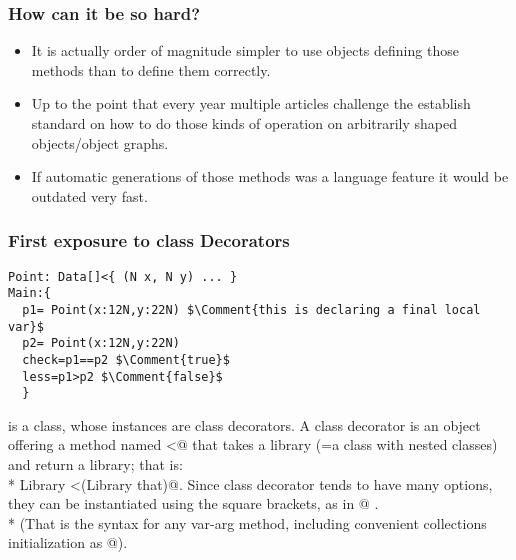 \begin{frame}[fragile]
\frametitle{How can it be so hard?}
\begin{itemize}
\item It is actually order of magnitude  simpler to use objects defining those methods than to define them correctly.
\pause\item Up to the point that every year multiple articles challenge  the establish standard on how to
do those kinds of operation on arbitrarily shaped objects/object graphs.
\pause\item If automatic generations of those methods was a language feature
it would be outdated very fast.
\end{itemize}
\end{frame}


\begin{frame}[fragile]
\frametitle{First exposure to class Decorators}
\begin{NiceCode}{59ex}{0.8}
\begin{lstlisting}
Point: Data[]<{ (N x, N y) ... }
Main:{
  p1= Point(x:12N,y:22N) $\Comment{this is declaring a final local var}$
  p2= Point(x:12N,y:22N)
  check=p1==p2 $\Comment{true}$
  less=p1>p2 $\Comment{false}$
  }
\end{lstlisting}
\end{NiceCode}
\Q@Data@  is a class, whose instances are class decorators.
A class decorator is an object offering  a method named \Q@<@ that takes a library (=a class with nested classes) and return a library; that is:\\*
\Q@method Library <(Library that)@.
Since class decorator tends to have many options, they can be instantiated using the square brackets, as in @  .\\*
(That is the syntax for any var-arg method, including convenient collections initialization as \Q@NVec[a;b;c;]@).

\end{frame}


